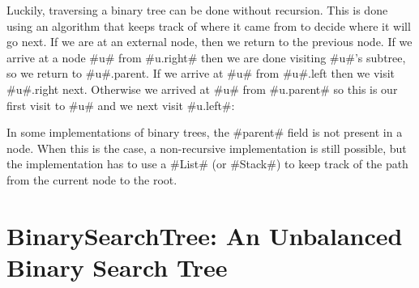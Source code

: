 Luckily, traversing a binary tree can be done without recursion. This is
done using an algorithm that keeps track of where it came from to decide
where it will go next.  If we are at an external node, then we return
to the previous node.  If we arrive at a node #u# from #u.right# then
we are done visiting #u#'s subtree, so we return to #u#.parent.  If we
arrive at #u# from #u#.left then we visit #u#.right next.  Otherwise we
arrived at #u# from #u.parent# so this is our first visit to #u# and we
next visit #u.left#:

In some implementations of binary trees, the #parent# field is not present
in a node.  When this is the case, a non-recursive implementation is
still possible, but the implementation has to use a #List# (or #Stack#)
to keep track of the path from the current node to the root.





\section{BinarySearchTree: An Unbalanced Binary Search Tree}


